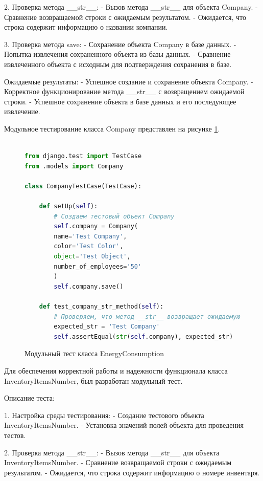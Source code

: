 2. Проверка метода \_\_str\_\_:
- Вызов метода \_\_str\_\_ для объекта Company.
- Сравнение возвращаемой строки с ожидаемым результатом.
- Ожидается, что строка содержит информацию о названии компании.

3. Проверка метода save:
- Сохранение объекта Company в базе данных.
- Попытка извлечения сохраненного объекта из базы данных.
- Сравнение извлеченного объекта с исходным для подтверждения сохранения в базе.

Ожидаемые результаты:
- Успешное создание и сохранение объекта Company.
- Корректное функционирование метода \_\_str\_\_ с возвращением ожидаемой строки.
- Успешное сохранение объекта в базе данных и его последующее извлечение.

Модульное тестирование класса Company представлен на рисунке \ref{Company:image}.

\begin{figure}[ht]
\begin{lstlisting}[language=Python]

from django.test import TestCase
from .models import Company

class CompanyTestCase(TestCase):

	def setUp(self):
		# Создаем тестовый объект Company
		self.company = Company(
		name='Test Company',
		color='Test Color',
		object='Test Object',
		number_of_employees='50'
		)
		self.company.save()
	
	def test_company_str_method(self):
		# Проверяем, что метод __str__ возвращает ожидаемую строку
		expected_str = 'Test Company'
		self.assertEqual(str(self.company), expected_str)

\end{lstlisting}  
\caption{Модульный тест класса EnergyConsumption}
\label{Company:image}
\end{figure}


\newpage

Для обеспечения корректной работы и надежности функционала класса InventoryItemsNumber, был разработан модульный тест.

Описание теста:

1. Настройка среды тестирования:
- Создание тестового объекта InventoryItemsNumber.
- Установка значений полей объекта для проведения тестов.

2. Проверка метода \_\_str\_\_:
- Вызов метода \_\_str\_\_ для объекта InventoryItemsNumber.
- Сравнение возвращаемой строки с ожидаемым результатом.
- Ожидается, что строка содержит информацию о номере инвентаря.

